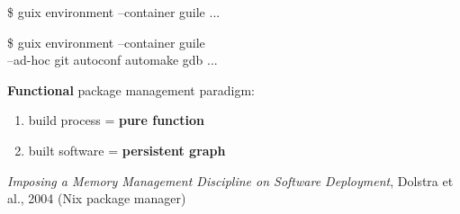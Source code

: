 \documentclass{beamer}
\newcommand{\highlight}[1]{\alert{\textbf{#1}}}
\begin{document}
\begin{frame}[plain]
\end{frame}

\begin{frame}[fragile]
  \begin{semiverbatim}
\$ guix environment --container guile
\textrm{...}

\$ guix environment --container guile \\
     --ad-hoc git autoconf automake gdb
\textrm{...}

  \end{semiverbatim}
\end{frame}

\begin{frame}[fragile]
  \vspace{2cm}
  \Large{
    \textbf{Functional} package management paradigm:

    \begin{enumerate}
    \item build process = \highlight{pure function}
    \item built software = \highlight{persistent graph}
    \end{enumerate}
  }

  \vfill{}
  \small{
    \textit{Imposing a Memory Management Discipline on
      Software Deployment}, Dolstra et al., 2004 (Nix package manager)
  }
\end{frame}
\end{document}
